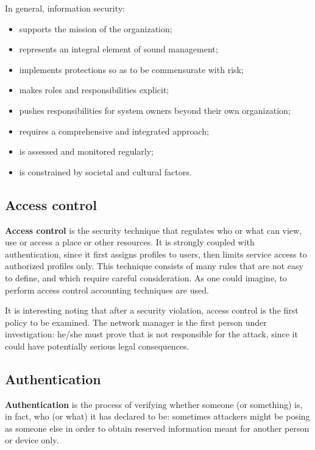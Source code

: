 In general, information security:
\begin{itemize}
    \item supports the mission of the organization;
    \item represents an integral element of sound management;
    \item implements protections so as to be commensurate with risk;
    \item makes roles and responsibilities explicit;
    \item pushes responsibilities for system owners beyond their own organization;
    \item requires a comprehensive and integrated approach;
    \item is assessed and monitored regularly;
    \item is constrained by societal and cultural factors.
\end{itemize}


\subsection{Access control}
\textbf{Access control} is the security technique that regulates who or what can view, use or access a place or other resources. It is strongly coupled with authentication, since it first assigns profiles to users, then limits service access to authorized profiles only. This technique consists of many rules that are not easy to define, and which require careful consideration. As one could imagine, to perform access control accounting techniques are used.

It is interesting noting that after a security violation, access control is the first policy to be examined. The network manager is the first person under investigation: he/she must prove that is not responsible for the attack, since it could have potentially serious legal consequences.


\subsection{Authentication}
\textbf{Authentication} is the process of verifying whether someone (or something) is, in fact, who (or what) it has declared to be: sometimes attackers might be posing as someone else in order to obtain reserved information meant for another person or device only.

